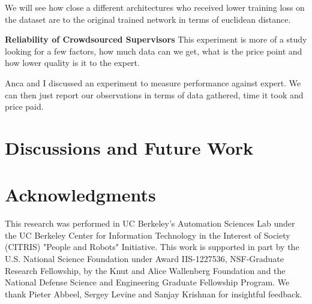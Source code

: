 \documentclass[10pt, conference]{ieeeconf}      %
\begin{document}
We will see how close a different architectures who received lower training loss on the dataset are to the original trained network in terms of euclidean distance. 

\noindent \textbf{Reliability of Crowdsourced Supervisors}
This experiment is more of a study looking for a few factors, how much data can we get, what is the price point and how lower quality is it to the expert. 

Anca and I discussed an experiment to measure performance against expert. We can then just report our observations in terms of data gathered, time it took and price paid. 


 
\section{Discussions and Future Work}

 \section{Acknowledgments} 
This research was performed in UC Berkeley's Automation Sciences Lab under the UC Berkeley Center for Information Technology in the Interest of Society (CITRIS) "People and Robots" Initiative. This work is supported in part by the U.S. National Science Foundation under Award IIS-1227536, NSF-Graduate Research Fellowship, by the Knut and Alice Wallenberg Foundation and the National Defense Science and Engineering Graduate Fellowship Program. We thank Pieter Abbeel, Sergey Levine and Sanjay Krishnan for insightful feedback. 

  


\end{document}
